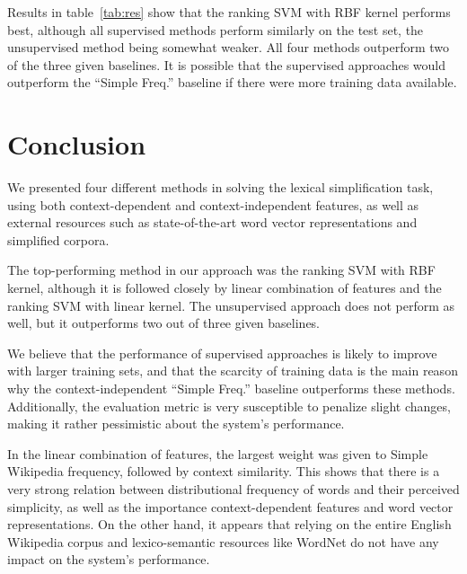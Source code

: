 \documentclass[10pt, a4paper]{article}
\begin{document}
Results in table~\ref{tab:res} show that the ranking SVM with RBF kernel performs best, although all supervised methods perform similarly on the test set, the unsupervised method being somewhat weaker. All four methods outperform two of the three given baselines. It is possible that the supervised approaches would outperform the ``Simple Freq.'' baseline if there were more training data available.

\section{Conclusion}

We presented four different methods in solving the lexical simplification task, using both context-dependent and context-independent features, as well as external resources such as state-of-the-art word vector representations and simplified corpora.

The top-performing method in our approach was the ranking SVM with RBF kernel, although it is followed closely by linear combination of features and the ranking SVM with linear kernel. The unsupervised approach does not perform as well, but it outperforms two out of three given baselines.

We believe that the performance of supervised approaches is likely to improve with larger training sets, and that the scarcity of training data is the main reason why the context-independent ``Simple Freq.'' baseline outperforms these methods. Additionally, the evaluation metric  is very susceptible to penalize slight changes, making it rather pessimistic about the system's performance.

In the linear combination of features, the largest weight was given to Simple Wikipedia frequency, followed by context similarity. This shows that there is a very strong relation between distributional frequency of words and their perceived simplicity, as well as the importance context-dependent features and word vector representations. On the other hand, it appears that relying on the entire English Wikipedia corpus and lexico-semantic resources like WordNet do not have any impact on the system's performance.



\end{document}
